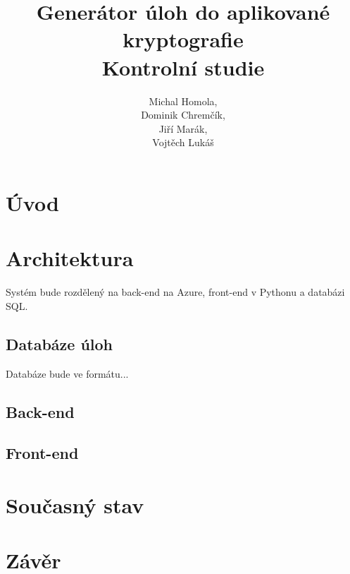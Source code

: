 \documentclass[titlepage]{article}
\title{Generátor úloh do aplikované kryptografie\\Kontrolní studie}
\author{Michal Homola,\\Dominik Chremčík,\\Jiří Marák,\\Vojtěch Lukáš}
\begin{document}
\maketitle

\tableofcontents

\section*{Úvod}

\section{Architektura}
Systém bude rozdělený na back-end na Azure, front-end v Pythonu a databázi SQL. 

\subsection{Databáze úloh}
Databáze bude ve formátu...

\subsection{Back-end}

\subsection{Front-end}

\section{Současný stav}

\section*{Závěr}
\end{document}
